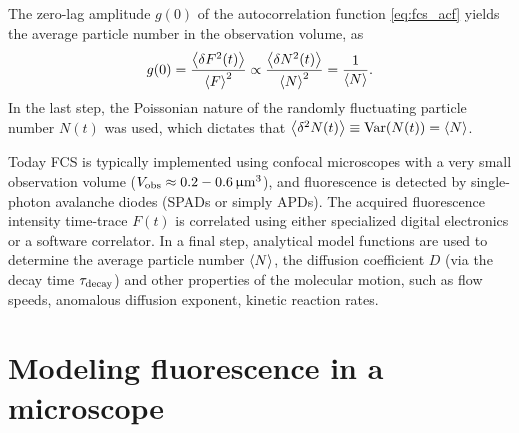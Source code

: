 The zero-lag amplitude $g(0)$ of the autocorrelation function \eqref{eq:fcs_acf} yields the average particle number in the observation volume, as
\begin{equation}\label{eq:fcs_acfn}
  g(0)=\frac{\bigl\langle \delta F^2(t)\bigr\rangle}{\left\langle F\right\rangle^2}\propto\frac{\bigl\langle \delta N^2(t)\bigr\rangle}{\left\langle N\right\rangle^2}=\frac{1}{\left\langle N\right\rangle}.
\end{equation}
In the last step, the Poissonian nature of the randomly fluctuating particle number $N(t)$ was used, which dictates that $\bigl\langle \delta^2 N(t)\bigr\rangle\equiv\operatorname{Var}(N(t))=\left\langle N\right\rangle$.



Today FCS is typically implemented using confocal microscopes with a very small observation volume ($\Vobs\approx0.2-0.6\unit{\mu m^3}$), and fluorescence is detected by  single-photon avalanche diodes (SPADs or simply APDs). The acquired fluorescence intensity time-trace $F(t)$ is  correlated using either specialized digital electronics or a software correlator. In a final step, analytical model functions are used to determine the average particle number $\left\langle N\right\rangle$, the diffusion coefficient $D$ (via the decay time $\tau_{\text{decay}}$) and other properties of the molecular motion, such as flow speeds, anomalous diffusion exponent, kinetic reaction rates. %


\section{Modeling fluorescence in a microscope}
\label{sec:FCSModelingTheOpticalSystem}

